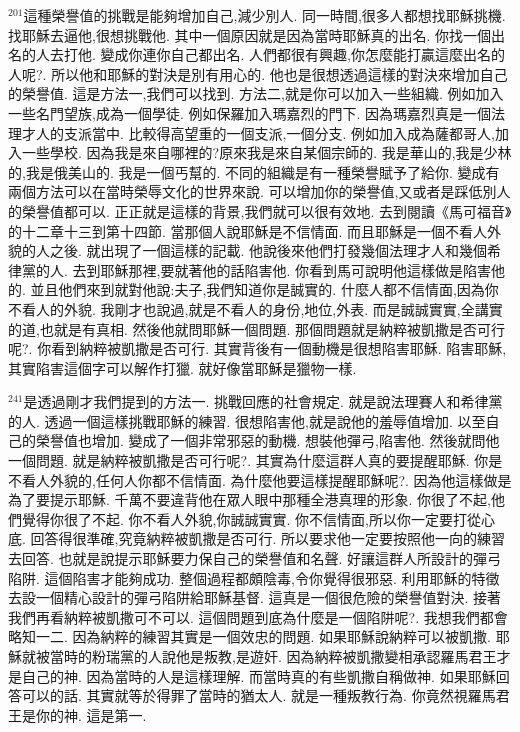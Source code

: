 \documentclass{book}
\begin{document}
$^{201}$這種榮譽值的挑戰是能夠增加自己,減少別人.
同一時間,很多人都想找耶穌挑機.
找耶穌去逼他,很想挑戰他.
其中一個原因就是因為當時耶穌真的出名.
你找一個出名的人去打他.
變成你連你自己都出名.
人們都很有興趣,你怎麼能打贏這麼出名的人呢?.
所以他和耶穌的對決是別有用心的.
他也是很想透過這樣的對決來增加自己的榮譽值.
這是方法一,我們可以找到.
方法二,就是你可以加入一些組織.
例如加入一些名門望族,成為一個學徒.
例如保羅加入瑪嘉烈的門下.
因為瑪嘉烈真是一個法理才人的支派當中.
比較得高望重的一個支派,一個分支.
例如加入成為薩都哥人,加入一些學校.
因為我是來自哪裡的?原來我是來自某個宗師的.
我是華山的,我是少林的,我是俄美山的.
我是一個丐幫的.
不同的組織是有一種榮譽賦予了給你.
變成有兩個方法可以在當時榮辱文化的世界來說.
可以增加你的榮譽值,又或者是踩低別人的榮譽值都可以.
正正就是這樣的背景,我們就可以很有效地.
去到閱讀《馬可福音》的十二章十三到第十四節.
當那個人說耶穌是不信情面.
而且耶穌是一個不看人外貌的人之後.
就出現了一個這樣的記載.
他說後來他們打發幾個法理才人和幾個希律黨的人.
去到耶穌那裡,要就著他的話陷害他.
你看到馬可說明他這樣做是陷害他的.
並且他們來到就對他說:夫子,我們知道你是誠實的.
什麼人都不信情面,因為你不看人的外貌.
我剛才也說過,就是不看人的身份,地位,外表.
而是誠誠實實,全講實的道,也就是有真相.
然後他就問耶穌一個問題.
那個問題就是納粹被凱撒是否可行呢?.
你看到納粹被凱撒是否可行.
其實背後有一個動機是很想陷害耶穌.
陷害耶穌,其實陷害這個字可以解作打獵.
就好像當耶穌是獵物一樣.

$^{241}$是透過剛才我們提到的方法一.
挑戰回應的社會規定.
就是說法理賽人和希律黨的人.
透過一個這樣挑戰耶穌的練習.
很想陷害他,就是說他的羞辱值增加.
以至自己的榮譽值也增加.
變成了一個非常邪惡的動機.
想裝他彈弓,陷害他.
然後就問他一個問題.
就是納粹被凱撒是否可行呢?.
其實為什麼這群人真的要提醒耶穌.
你是不看人外貌的,任何人你都不信情面.
為什麼他要這樣提醒耶穌呢?.
因為他這樣做是為了要提示耶穌.
千萬不要違背他在眾人眼中那種全港真理的形象.
你很了不起,他們覺得你很了不起.
你不看人外貌,你誠誠實實.
你不信情面,所以你一定要打從心底.
回答得很準確,究竟納粹被凱撒是否可行.
所以要求他一定要按照他一向的練習去回答.
也就是說提示耶穌要力保自己的榮譽值和名聲.
好讓這群人所設計的彈弓陷阱.
這個陷害才能夠成功.
整個過程都頗陰毒,令你覺得很邪惡.
利用耶穌的特徵去設一個精心設計的彈弓陷阱給耶穌基督.
這真是一個很危險的榮譽值對決.
接著我們再看納粹被凱撒可不可以.
這個問題到底為什麼是一個陷阱呢?.
我想我們都會略知一二.
因為納粹的練習其實是一個效忠的問題.
如果耶穌說納粹可以被凱撒.
耶穌就被當時的粉瑞黨的人說他是叛教,是遊奸.
因為納粹被凱撒變相承認羅馬君王才是自己的神.
因為當時的人是這樣理解.
而當時真的有些凱撒自稱做神.
如果耶穌回答可以的話.
其實就等於得罪了當時的猶太人.
就是一種叛教行為.
你竟然視羅馬君王是你的神.
這是第一.
\end{document}
